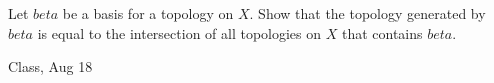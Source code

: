 \begin{samepage}
\begin{ex}
Let $beta$ be a basis for a topology on $X$. Show that the topology generated by $beta$ is equal to the intersection of all topologies on $X$ that contains $beta$.
\end{ex}
\begin{source}
Class, Aug 18
\end{source}
\end{samepage}
